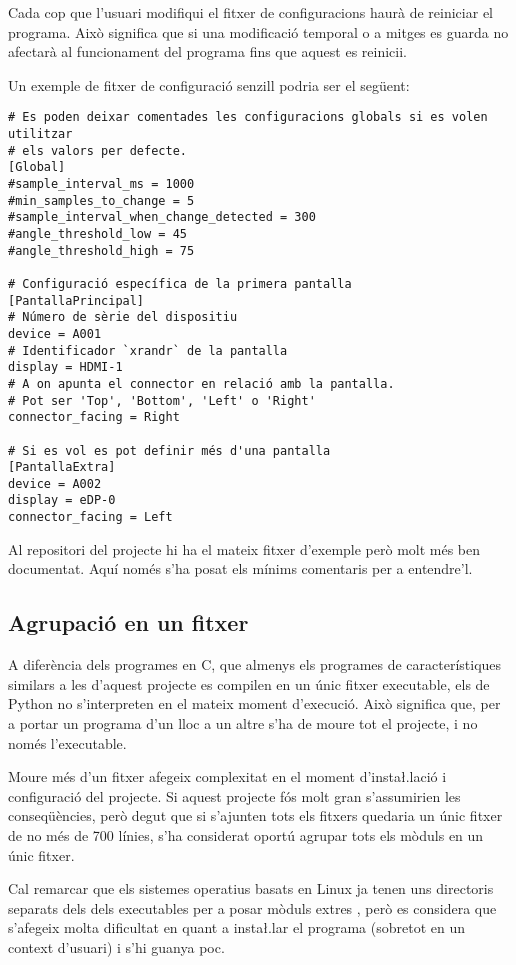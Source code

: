Cada cop que l'usuari modifiqui el fitxer de configuracions haurà de reiniciar
el programa. Això significa que si una modificació temporal o a mitges es guarda
no afectarà al funcionament del programa fins que aquest es reinicii.

Un exemple de fitxer de configuració senzill podria ser el següent:

\begin{verbatim}
# Es poden deixar comentades les configuracions globals si es volen utilitzar
# els valors per defecte.
[Global]
#sample_interval_ms = 1000
#min_samples_to_change = 5
#sample_interval_when_change_detected = 300
#angle_threshold_low = 45
#angle_threshold_high = 75

# Configuració específica de la primera pantalla
[PantallaPrincipal]
# Número de sèrie del dispositiu
device = A001
# Identificador `xrandr` de la pantalla
display = HDMI-1
# A on apunta el connector en relació amb la pantalla.
# Pot ser 'Top', 'Bottom', 'Left' o 'Right'
connector_facing = Right

# Si es vol es pot definir més d'una pantalla
[PantallaExtra]
device = A002
display = eDP-0
connector_facing = Left
\end{verbatim}

Al repositori del projecte hi ha el mateix fitxer d'exemple però molt més ben
documentat. Aquí només s'ha posat els mínims comentaris per a entendre'l.

\subsection{Agrupació en un fitxer}

A diferència dels programes en C, que almenys els programes de característiques
similars a les d'aquest projecte es compilen en un únic fitxer executable, els
 de Python no s'interpreten en el mateix moment d'execució. Això
significa que, per a portar un programa d'un lloc a un altre s'ha de moure tot
el projecte, i no només l'executable.

Moure més d'un fitxer afegeix complexitat en el moment d'insta\l.lació i
configuració del projecte. Si aquest projecte fós molt gran s'assumirien les
conseqüències, però degut que si s'ajunten tots els fitxers quedaria un únic
fitxer de no més de 700 línies, s'ha considerat oportú agrupar tots els mòduls
en un únic fitxer.

Cal remarcar que els sistemes operatius basats en Linux ja tenen uns directoris
separats dels dels executables per a posar mòduls extres \cite{InstallPython3},
però es considera que
s'afegeix molta dificultat en quant a insta\l.lar el programa (sobretot en un
context d'usuari) i s'hi guanya poc.

